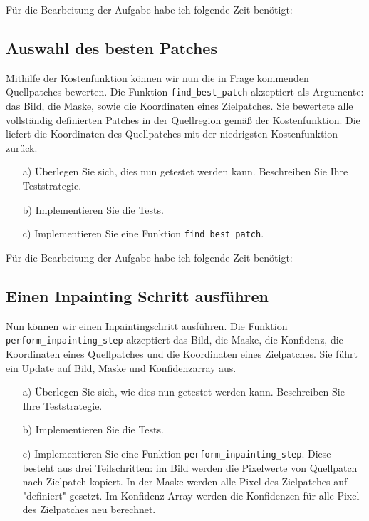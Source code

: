 Für die Bearbeitung der Aufgabe habe ich folgende Zeit benötigt:

\subsection{Auswahl des besten Patches}

Mithilfe der Kostenfunktion können wir nun die in Frage kommenden Quellpatches bewerten. Die Funktion \texttt{find\_best\_patch} akzeptiert als Argumente: das Bild, die Maske, sowie die Koordinaten eines Zielpatches. Sie bewertete alle vollständig definierten Patches in der Quellregion gemäß der Kostenfunktion. Die liefert die Koordinaten des Quellpatches mit der niedrigsten Kostenfunktion zurück.

\begin{enumerate}

\item[a)] Überlegen Sie sich, dies nun getestet werden kann. Beschreiben Sie Ihre Teststrategie.

\item[b)] Implementieren Sie die Tests. 

\item[c)] Implementieren Sie eine Funktion \texttt{find\_best\_patch}. 

\end{enumerate}

Für die Bearbeitung der Aufgabe habe ich folgende Zeit benötigt:

\subsection{Einen Inpainting Schritt ausführen}

Nun können wir einen Inpaintingschritt ausführen. Die Funktion \texttt{perform\_inpainting\_step}
akzeptiert das Bild, die Maske, die Konfidenz, die Koordinaten eines Quellpatches und die Koordinaten eines Zielpatches. Sie führt ein Update auf Bild, Maske und Konfidenzarray aus.

\begin{enumerate}

\item[a)] Überlegen Sie sich, wie dies nun getestet werden kann. Beschreiben Sie Ihre Teststrategie.

\item[b)] Implementieren Sie die Tests. 

\item[c)] Implementieren Sie eine Funktion \texttt{perform\_inpainting\_step}. Diese besteht aus drei Teilschritten: im Bild werden die Pixelwerte von Quellpatch nach Zielpatch kopiert. In der Maske werden alle Pixel des Zielpatches auf "definiert" gesetzt. Im Konfidenz-Array werden die Konfidenzen für alle Pixel des Zielpatches neu berechnet.  

\end{enumerate}

